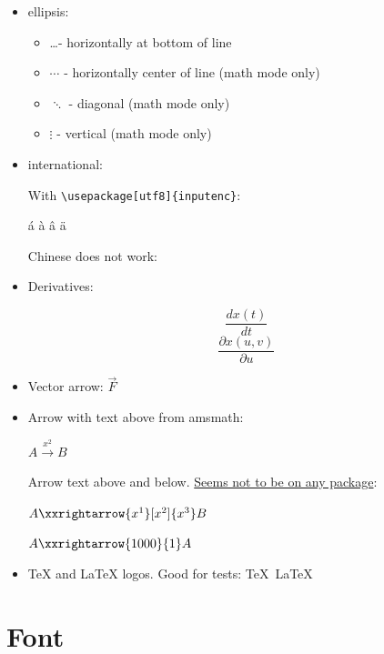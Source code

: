 \documentclass[12pt]{article}
\begin{document}
  \begin{itemize}

    \item ellipsis:

      \begin{itemize}
        \item  \ldots   - horizontally at bottom of line
        \item  $\cdots$ - horizontally center of line (math mode only)
        \item  $\ddots$ - diagonal (math mode only)
        \item  $\vdots$ - vertical (math mode only)
      \end{itemize}

    \item international:

      With \lstinline|\usepackage[utf8]{inputenc}|:

      á à â ä

      Chinese does not work: %

    \item Derivatives:

      $$ \frac{dx(t)}{dt} $$
      $$ \frac{\partial x(u,v)}{\partial u} $$

    \item Vector arrow: $\vec{F}$

    \item Arrow with text above from amsmath:

        $A\xrightarrow{x^2}B$

      Arrow text above and below. \href{http://tex.stackexchange.com/questions/27545/custom-length-arrows-text-over-and-under}{Seems not to be on any package}:

        $A\xxrightarrow{x^1}[x^2]{x^3}B$

        $A\xxrightarrow{1000}{1}A$

    \item TeX and LaTeX logos. Good for tests: \TeX\ \LaTeX
  \end{itemize}

\section{Font}\label{font}
\end{document}
